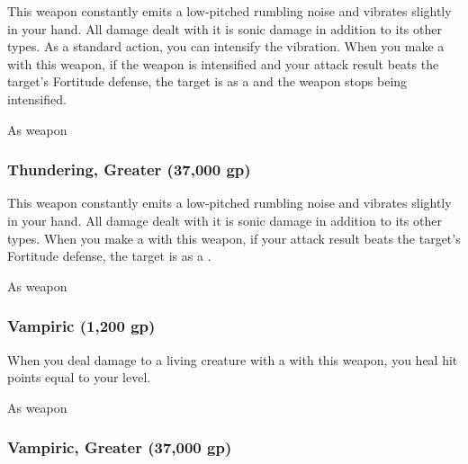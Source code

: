 This weapon constantly emits a low-pitched rumbling noise and vibrates slightly in your hand.
All damage dealt with it is sonic damage in addition to its other types.
As a standard action, you can intensify the vibration.
When you make a  with this weapon, if the weapon is intensified and your attack result beats the target's Fortitude defense,
the target is \deafened as a  and the weapon stops being intensified.



 


 As weapon


\lowercase{\hypertarget{item:Thundering, Greater}{}}\label{item:Thundering, Greater}
\hypertarget{item:Thundering, Greater}{\subsubsection{Thundering, Greater\hfill{} (37,000 gp)}}

This weapon constantly emits a low-pitched rumbling noise and vibrates slightly in your hand.
All damage dealt with it is sonic damage in addition to its other types.
When you make a  with this weapon, if your attack result beats the target's Fortitude defense, the target is \deafened as a .



 


 As weapon


\lowercase{\hypertarget{item:Vampiric}{}}\label{item:Vampiric}
\hypertarget{item:Vampiric}{\subsubsection{Vampiric\hfill{} (1,200 gp)}}

When you deal damage to a living creature with a  with this weapon, you heal hit points equal to your level.



 


 As weapon


\lowercase{\hypertarget{item:Vampiric, Greater}{}}\label{item:Vampiric, Greater}
\hypertarget{item:Vampiric, Greater}{\subsubsection{Vampiric, Greater\hfill{} (37,000 gp)}}

